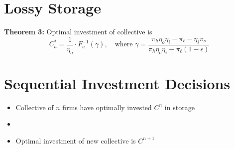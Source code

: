\documentclass[a0,portrait]{a0poster}
\begin{document}
\begin{multicols}{3}




\section*{Lossy Storage}


\noindent \textbf{Theorem 3:}
Optimal investment of collective is
\[ C_a^\ast = \frac{1}{\eta_o} \cdot F_a^{-1} (\gamma), \quad \text{where    } 
\gamma = \frac{\pi_h \eta_o \eta_i - \pi_\ell - \eta_i \pi_s   }{ \pi_h \eta_o \eta_i - \pi_\ell ( 1 - \epsilon) } 
\]



\section*{Sequential Investment Decisions}

\begin{itemize}
\item Collective of $n$ firms have optimally invested $C^n$ in storage
\item {}
\item Optimal investment of new collective is $C^{n+1}$ 
\end{itemize}


\end{multicols}
\end{document}
